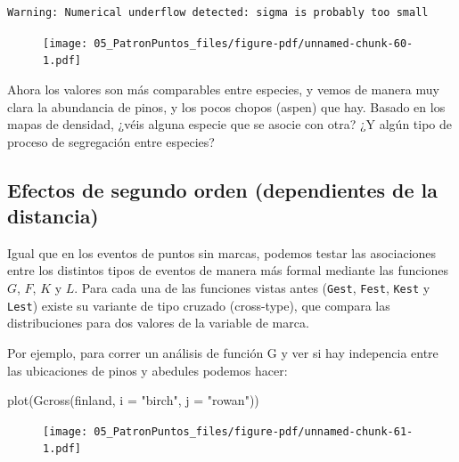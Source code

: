 \documentclass[
  letterpaper,
  DIV=11,
  numbers=noendperiod]{scrreprt}
\newenvironment{Shaded}{\begin{snugshade}}{\end{snugshade}}
\newcommand{\AttributeTok}[1]{\textcolor[rgb]{0.40,0.45,0.13}{#1}}
\newcommand{\FunctionTok}[1]{\textcolor[rgb]{0.28,0.35,0.67}{#1}}
\newcommand{\NormalTok}[1]{\textcolor[rgb]{0.00,0.23,0.31}{#1}}
\newcommand{\StringTok}[1]{\textcolor[rgb]{0.13,0.47,0.30}{#1}}
\begin{document}
\begin{verbatim}
Warning: Numerical underflow detected: sigma is probably too small
\end{verbatim}

\begin{figure}[H]

{\centering \texttt{[image: 05\_PatronPuntos\_files/figure-pdf/unnamed-chunk-60-1.pdf]}

}

\end{figure}

Ahora los valores son más comparables entre especies, y vemos de manera
muy clara la abundancia de pinos, y los pocos chopos (aspen) que hay.
Basado en los mapas de densidad, ¿véis alguna especie que se asocie con
otra? ¿Y algún tipo de proceso de segregación entre especies?

\hypertarget{efectos-de-segundo-orden-dependientes-de-la-distancia}{%
\subsection{Efectos de segundo orden (dependientes de la
distancia)}\label{efectos-de-segundo-orden-dependientes-de-la-distancia}}

Igual que en los eventos de puntos sin marcas, podemos testar las
asociaciones entre los distintos tipos de eventos de manera más formal
mediante las funciones \(G\), \(F\), \(K\) y \(L\). Para cada una de las
funciones vistas antes (\texttt{Gest}, \texttt{Fest}, \texttt{Kest} y
\texttt{Lest}) existe su variante de tipo cruzado (cross-type), que
compara las distribuciones para dos valores de la variable de marca.

Por ejemplo, para correr un análisis de función G y ver si hay
indepencia entre las ubicaciones de pinos y abedules podemos hacer:

\begin{Shaded}
\begin{Highlighting}[]
\FunctionTok{plot}\NormalTok{(}\FunctionTok{Gcross}\NormalTok{(finland, }\AttributeTok{i =} \StringTok{"birch"}\NormalTok{, }\AttributeTok{j =} \StringTok{"rowan"}\NormalTok{))}
\end{Highlighting}
\end{Shaded}

\begin{figure}[H]

{\centering \texttt{[image: 05\_PatronPuntos\_files/figure-pdf/unnamed-chunk-61-1.pdf]}

}

\end{figure}
\end{document}
